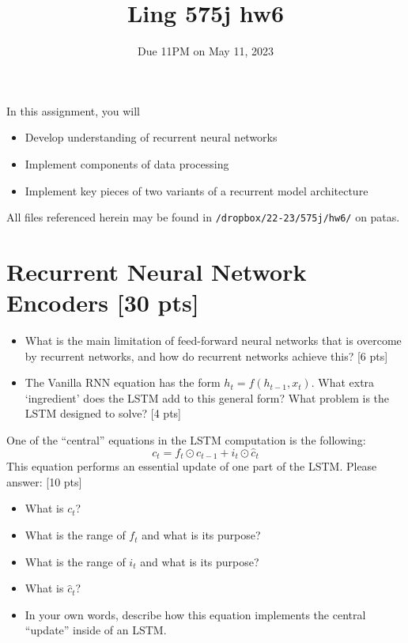 \documentclass[11pt]{article}
\begin{document}
\title{Ling 575j hw6}
\date{\vspace{-0.2in}Due 11PM on May 11, 2023}
\maketitle


\noindent In this assignment, you will 
\begin{itemize}
  \item Develop understanding of recurrent neural networks
  \item Implement components of data processing 
  \item Implement key pieces of two variants of a recurrent model architecture
\end{itemize}
All files referenced herein may be found in \texttt{/dropbox/22-23/575j/hw6/} on patas.


\section{Recurrent Neural Network Encoders [30 pts]}

\begin{itemize}
  \item What is the main limitation of feed-forward neural networks that is overcome by recurrent networks, and how do recurrent networks achieve this? \hfill [6 pts]
  \item The Vanilla RNN equation has the form $h_t = f(h_{t-1}, x_t)$.  What extra `ingredient' does the LSTM add to this general form?  What problem is the LSTM designed to solve? \hfill [4 pts]
\end{itemize}

\vspace{2em}
  One of the ``central'' equations in the LSTM computation is the following:
\[ c_t = f_t \odot c_{t-1} + i_t \odot \hat{c}_t \]
This equation performs an essential update of one part of the LSTM.  Please answer: \hfill [10 pts]
\begin{itemize}
  \item What is $c_t$?
  \item What is the range of $f_t$ and what is its purpose?
  \item What is the range of $i_t$ and what is its purpose?
  \item What is $\hat{c}_t$?
  \item In your own words, describe how this equation implements the central ``update'' inside of an LSTM.
\end{itemize}
\end{document}
